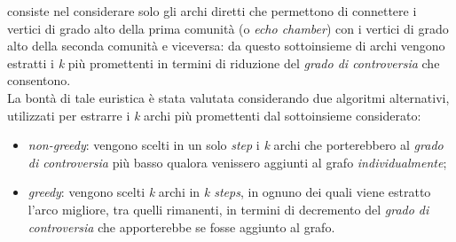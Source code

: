 \documentclass[trieste,12pt]{toptesi}
\begin{document}
consiste nel considerare solo gli archi diretti che permettono di connettere i vertici di grado alto della prima comunità (o \textit{echo chamber}) con i vertici di grado alto della seconda comunità e viceversa: da questo sottoinsieme di archi vengono estratti i \textit{k} più promettenti in termini di riduzione del \textit{grado di controversia} che consentono.\\La bontà di tale euristica è stata valutata considerando due algoritmi alternativi, utilizzati per estrarre i \textit{k} archi più promettenti dal sottoinsieme considerato: 
\begin{itemize}
\item \textit{non-greedy}: vengono scelti in un solo \textit{step} i \textit{k} archi che porterebbero al \textit{grado di controversia} più basso qualora venissero aggiunti al grafo \textit{individualmente};
\item \textit{greedy}: vengono scelti \textit{k} archi in \textit{k steps}, in ognuno dei quali viene estratto l'arco migliore, tra quelli rimanenti, in termini di decremento del \textit{grado di controversia} che apporterebbe se fosse aggiunto al grafo.
\end{itemize}
\end{document}

